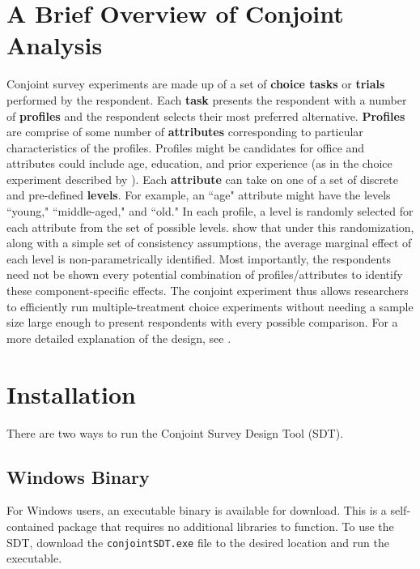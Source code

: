 \documentclass[12pt]{article}
\begin{document}
\section{A Brief Overview of Conjoint Analysis}

Conjoint survey experiments are made up of a set of  \textbf{choice tasks} or \textbf{trials} performed by the respondent. Each \textbf{task} presents the respondent with a number of \textbf{profiles} and the respondent selects their most preferred alternative. \textbf{Profiles} are comprise of some number of \textbf{attributes} corresponding to particular characteristics of the profiles. Profiles might be candidates for office and attributes could include age, education, and prior experience (as in the choice experiment described by \cite{hainmueller2013}). Each \textbf{attribute} can take on one of a set of discrete and pre-defined \textbf{levels}. For example, an ``age" attribute might have the levels ``young," ``middle-aged," and ``old." In each profile, a level is randomly selected for each attribute from the set of possible levels. \cite{hainmueller2013} show that under this randomization, along with a simple set of consistency assumptions, the average marginal effect of each level is non-parametrically identified. Most importantly, the respondents need not be shown every potential combination of profiles/attributes to identify these component-specific effects. The conjoint experiment thus allows researchers to efficiently run multiple-treatment choice experiments without needing a sample size large enough to present respondents with every possible comparison. For a more detailed explanation of the design, see \cite{hainmueller2013}.

\section{Installation}

There are two ways to run the Conjoint Survey Design Tool (SDT). 

\subsection{Windows Binary}

For Windows users, an executable binary is available for download. This is a self-contained package that requires no additional libraries to function. To use the SDT, download the \texttt{conjointSDT.exe} file to the desired location and run the executable.
\end{document}
